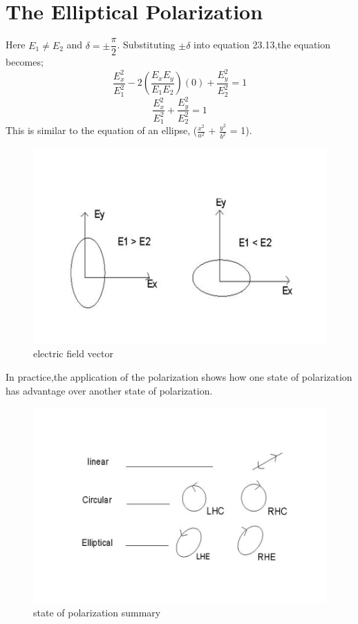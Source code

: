 \section{The Elliptical Polarization}
Here $E_1\neq E_2$ and $\delta = \pm \dfrac{\pi}{2} $. Substituting $\pm \delta$ into equation 23.13,the equation becomes;
\begin{equation}
\frac{E_{x}^2}{E_{1}^2} -2(\frac{E_{x}E_{y}}{E_{1}E_{2}})(0) + \frac{E_{y}^2}{E_{2}^2} = 1
\end{equation}
\begin{equation}
\frac{E_{x}^2}{E_{1}^2} + \frac{E_{y}^2}{E_{2}^2} = 1
\end{equation}
This is similar to the equation of an ellipse, ($\frac{x^2}{a^2}$ + $\frac{y^2}{b^2}$ = 1).
\begin{figure}[h]
\centering
\includegraphics[width=.8\linewidth]{./graphics/eeee}
\caption{electric field vector}
\end{figure}

In practice,the application of the polarization shows how one state of polarization has advantage over another state of polarization.
\begin{figure}[h]
\centering
\includegraphics[width=.8\linewidth]{./graphics/eee}
\caption{state of polarization summary}
\end{figure}

